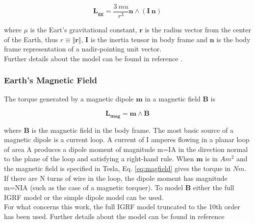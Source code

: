 \documentclass[11pt,a4paper]{report}
\begin{document}
\begin{equation}
 \mathbf{L_{gg}} = \frac{3 \ mu}{r^3} \mathbf{n} \wedge (\mathbf{I} \ \mathbf{n})
\end{equation}

where $\mu$ is the Eart's gravitational constant, $\textbf{r}$ is the radius vector from the center of the Earth, thus $r \equiv \Vert{\textbf{r}}\Vert$, $\textbf{I}$ is the inertia tensor in body frame and $\textbf{n}$ is the body frame representation of a nadir-pointing unit vector.\\
Further details about the model can be found in reference \cite{Ref:Books:Fundamentals}.

\subsubsection{Earth's Magnetic Field}
The torque generated by a magnetic dipole $\textbf{m}$ in a magnetic field $\textbf{B}$ is

\begin{equation}
 \mathbf{L_{mag}} = \mathbf{m} \wedge \mathbf{B}
 \label{eq:magfield}
\end{equation}

where $\mathbf{B}$ is the magnetic field in the body frame.
The most basic source of a magnetic dipole is a current loop. A current of I amperes flowing in a planar loop of area A produces a dipole moment of magnitude m=IA in the direction normal to the plane of the loop and satisfying a right-hand rule.
When $\textbf{m}$ is in $Am^2$ and the magnetic field is specified in Tesla, Eq. \ref{eq:magfield} gives the torque in $Nm$. If there are N turns of wire in the loop, the dipole moment has magnitude m=NIA (such as the case of a magnetic torquer).
To model $\textbf{B}$ either the full IGRF model or the simple dipole model can be used.\\
For what concerns this work, the full IGRF model truncated to the 10th order has been used. Further details about the model can be found in reference \cite{Ref:Articles:IGRF}
\end{document}
